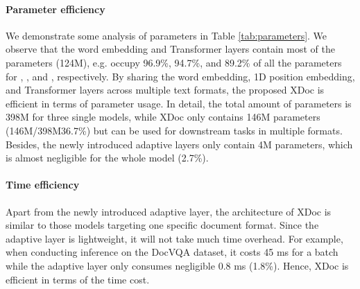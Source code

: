 \documentclass[11pt]{article}
\begin{document}
\begin{table*}[t]
\centering
{}
\caption{Analysis of the parameter efficiency. XDoc shares most parameters across different formats, including word embedding, 1D position embedding, and Transformer layers. We omit some layers that contain negligible parameters such as segment embedding layers and LayerNorm layers. All the comparison models are in \textbf{base} size.}
\label{tab:parameters}
\end{table*}


\paragraph{Parameter efficiency}
We demonstrate some analysis of parameters in Table \ref{tab:parameters}. We observe that the word embedding and Transformer layers contain most of the parameters (124M), e.g. occupy 96.9\%, 94.7\%, and 89.2\% of all the parameters for , , and , respectively. By sharing the word embedding, 1D position embedding, and Transformer layers across multiple text formats, the proposed XDoc is efficient in terms of parameter usage. In detail, the total amount of parameters is 398M for three single models, while XDoc only contains 146M parameters (146M/398M36.7\%) but can be used for downstream tasks in multiple formats. Besides, the newly introduced adaptive layers only contain 4M parameters, which is almost negligible for the whole model (2.7\%).

\paragraph{Time efficiency} Apart from the newly introduced adaptive layer, the architecture of XDoc is similar to those models targeting one specific document format. Since the adaptive layer is lightweight, it will not take much time overhead. For example, when conducting inference on the DocVQA dataset, it costs 45 ms for a batch while the adaptive layer only consumes negligible 0.8 ms (1.8\%). Hence, XDoc is efficient in terms of the time cost. 
\end{document}
